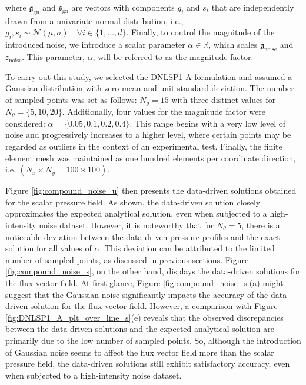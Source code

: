 where $ \mathfrak{g}_{\text{gn}} $ and $ \mathfrak{s}_{\text{gn}} $ are vectors with components $ g_{i} $ and $ s_{i} $ that are independently drawn from a univariate normal distribution, i.e., $ g_{i}, s_{i} \sim \mathcal{N}(\mu, \sigma) \quad \forall i \in \{1, \dots, d\} $. Finally, to control the magnitude of the introduced noise, we introduce a scalar parameter $ \alpha \in \mathbb{R} $, which scales $ \mathfrak{g}_{\text{noise}} $ and $ \mathfrak{s}_{\text{noise}} $. This parameter, $ \alpha $, will be referred to as the magnitude factor.

To carry out this study, we selected the DNLSP1-A formulation and assumed a Gaussian distribution with zero mean and unit standard deviation. The number of sampled points was set as follows: \( N_{g} = 15 \) with three distinct values for \( N_{\theta} = \{5, 10, 20\} \). Additionally, four values for the magnitude factor were considered: \( \alpha = \{0.05, 0.1, 0.2, 0.4\} \). This range begins with a very low level of noise and progressively increases to a higher level, where certain points may be regarded as outliers in the context of an experimental test. Finally, the finite element mesh was maintained as one hundred elements per coordinate direction, i.e. $ (N_{x}\times N_{y} = 100 \times 100) $.

Figure \ref{fig:compound_noise_u} then presents the data-driven solutions obtained for the scalar pressure field. As shown, the data-driven solution closely approximates the expected analytical solution, even when subjected to a high-intensity noise dataset. However, it is noteworthy that for \( N_{\theta} = 5 \), there is a noticeable deviation between the data-driven pressure profiles and the exact solution for all values of \( \alpha \). This deviation can be attributed to the limited number of sampled points, as discussed in previous sections. Figure \ref{fig:compound_noise_s}, on the other hand, displays the data-driven solutions for the flux vector field. At first glance, Figure \ref{fig:compound_noise_s}(a) might suggest that the Gaussian noise significantly impacts the accuracy of the data-driven solution for the flux vector field. However, a comparison with Figure \ref{fig:DNLSP1_A_plt_over_line_s}(e) reveals that the observed discrepancies between the data-driven solutions and the expected analytical solution are primarily due to the low number of sampled points. So, although the introduction of Gaussian noise seems to affect the flux vector field more than the scalar pressure field, the data-driven solutions still exhibit satisfactory accuracy, even when subjected to a high-intensity noise dataset.



